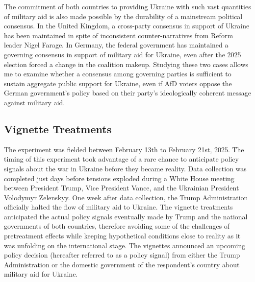 The commitment of both countries to providing Ukraine with such vast quantities of military aid is also made possible by the durability of a mainstream political consensus. In the United Kingdom, a cross-party consensus in support of Ukraine has been maintained in spite of inconsistent counter-narratives from Reform leader Nigel Farage. In Germany, the federal government has maintained a governing consensus in support of military aid for Ukraine, even after the 2025 election forced a change in the coalition makeup. Studying these two cases allows me to examine whether a consensus among governing parties is sufficient to sustain aggregate public support for Ukraine, even if AfD voters oppose the German government's policy based on their party's ideologically coherent message against military aid.  

\subsection{Vignette Treatments}
The experiment was fielded between February 13th to February 21st, 2025. The timing of this experiment took advantage of a rare chance to anticipate policy signals about the war in Ukraine before they became reality. Data collection was completed just days before tensions exploded during a White House meeting between President Trump, Vice President Vance, and the Ukrainian President Volodymyr Zelenskyy. One week after data collection, the Trump Administration officially halted the flow of military aid to Ukraine. The vignette treatments anticipated the actual policy signals eventually made by Trump and the national governments of both countries, therefore avoiding some of the challenges of pretreatment effects while keeping hypothetical conditions close to reality as it was unfolding on the international stage. The vignettes announced an upcoming policy decision (hereafter referred to as a policy signal) from either the Trump Administration or the domestic government of the respondent's country about military aid for Ukraine. 

